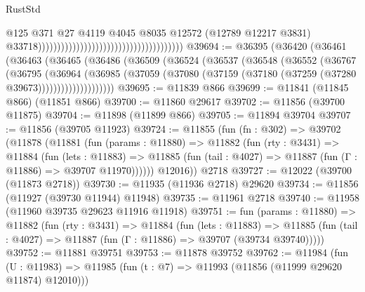 \begin{lexlean}{RustStd}
\begin{coremodule}
                                                                                @125
                                                                                @371
                                                                                @27
                                                                                @4119
                                                                                @4045
                                                                                @8035
                                                                                @12572
                                                                                (@12789
                                                                                  @12217
                                                                                  @3831)
                                                                                @33718))))))))))))))))))))))))))))))))))))))
@39694 := @36395
    (@36420
      (@36461
        (@36463
          (@36465
            (@36486
              (@36509
                (@36524
                  (@36537
                    (@36548
                      (@36552
                        (@36767
                          (@36795
                            (@36964
                              (@36985
                                (@37059
                                  (@37080 (@37159 (@37180 (@37259 (@37280 @39673))))))))))))))))))))
@39695 := @11839 @866
@39699 := @11841 (@11845 @866) (@11851 @866)
@39700 := @11860 @29617
@39702 := @11856 (@39700 @11875)
@39704 := @11898 (@11899 @866)
@39705 := @11894 @39704
@39707 := @11856 (@39705 @11923)
@39724 := @11855
    (fun (fn : @302) =>
    @39702
      (@11878
        (@11881
          (fun (params : @11880) =>
          @11882
            (fun (rty : @3431) =>
            @11884
              (fun (lets : @11883) =>
              @11885 (fun (tail : @4027) => @11887 (fun (Γ : @11886) => @39707 @11970))))))
        @12016))
    @2718
@39727 := @12022 (@39700 (@11873 @2718))
@39730 := @11935 (@11936 @2718) @29620
@39734 := @11856 (@11927 (@39730 @11944) @11948)
@39735 := @11961 @2718
@39740 := @11958 (@11960 @39735 @29623 @11916 @11918)
@39751 := fun (params : @11880) =>
  @11882
    (fun (rty : @3431) =>
    @11884
      (fun (lets : @11883) =>
      @11885 (fun (tail : @4027) => @11887 (fun (Γ : @11886) => @39707 (@39734 @39740)))))
@39752 := @11881 @39751
@39753 := @11878 @39752
@39762 := @11984
    (fun (U : @11983) => @11985 (fun (t : @7) => @11993 (@11856 (@11999 @29620 @11874) @12010)))

\end{coremodule}
\end{lexlean}
